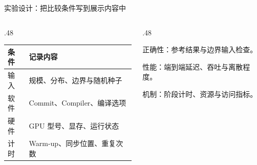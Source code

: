 \begin{frame}{实验设计：把比较条件写到展示内容中}
\begin{columns}[T,onlytextwidth]
\begin{column}{.48\textwidth}
\begin{tabularx}{\linewidth}{@{}lX@{}}
\toprule 条件 & 记录内容 \\\midrule
输入 & 规模、分布、边界与随机种子 \\
软件 & Commit、Compiler、编译选项 \\
硬件 & GPU 型号、显存、运行状态 \\
计时 & Warm-up、同步位置、重复次数 \\\bottomrule
\end{tabularx}
\end{column}
\begin{column}{.48\textwidth}
\begin{denseitems}
\item 正确性：参考结果与边界输入检查。
\item 性能：端到端延迟、吞吐与离散程度。
\item 机制：阶段计时、资源与访问指标。
\end{denseitems}
\end{column}
\end{columns}
\vspace{3mm}
\end{frame}
